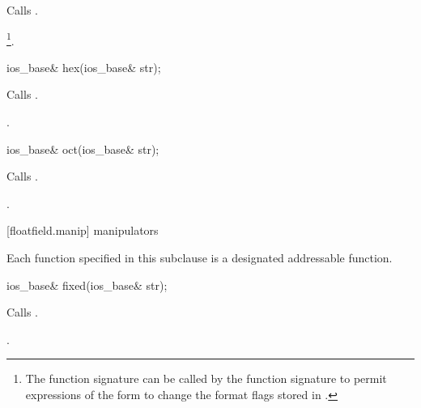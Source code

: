 \begin{itemdescr}
\pnum
\effects
Calls
.

\pnum
\returns
{}\footnote{The function signature
can be called by
the function signature
to permit expressions of the form
to change the format flags stored in
.}.
\end{itemdescr}

\begin{indexed}{}
\begin{itemdecl}
ios_base& hex(ios_base& str);
\end{itemdecl}
\end{indexed}

\begin{itemdescr}
\pnum
\effects
Calls
.

\pnum
\returns
{}.
\end{itemdescr}

\begin{indexed}{}
\begin{itemdecl}
ios_base& oct(ios_base& str);
\end{itemdecl}
\end{indexed}

\begin{itemdescr}
\pnum
\effects
Calls
.

\pnum
\returns
{}.
\end{itemdescr}

[floatfield.manip]{ manipulators}

\pnum
Each function specified in this subclause
is a designated addressable function.

\begin{indexed}{}
\begin{itemdecl}
ios_base& fixed(ios_base& str);
\end{itemdecl}
\end{indexed}

\begin{itemdescr}
\pnum
\effects
Calls
.

\pnum
\returns
{}.
\end{itemdescr}

